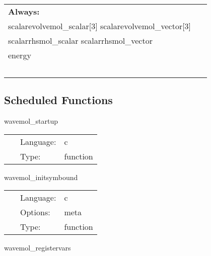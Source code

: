  \begin{tabular*}{160mm}{ll} 

{\bf Always:}&  ~ \\ 
 scalarevolvemol\_scalar[3] scalarevolvemol\_vector[3] & ~\\ 
 scalarrhsmol\_scalar scalarrhsmol\_vector & ~\\ 
 energy & ~\\ 
~ & ~\\ 
\end{tabular*} 


\subsection*{Scheduled Functions}
\vspace{5mm}


\hspace{5mm} wavemol\_startup 

\hspace{5mm}{\it register banner } 


\hspace{5mm}

 \begin{tabular*}{160mm}{cll} 
~ & Language:  & c \\ 
~ & Type:  & function \\ 
\end{tabular*} 


\vspace{5mm}


\hspace{5mm} wavemol\_initsymbound 

\hspace{5mm}{\it schedule symmetries } 


\hspace{5mm}

 \begin{tabular*}{160mm}{cll} 
~ & Language:  & c \\ 
~ & Options:  & meta \\ 
~ & Type:  & function \\ 
\end{tabular*} 


\vspace{5mm}


\hspace{5mm} wavemol\_registervars 


